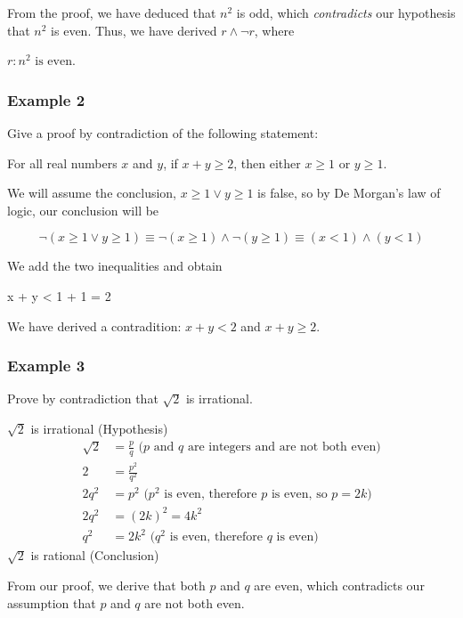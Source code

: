 From the proof, we have deduced that $n^2$ is odd, which \textit{contradicts} our hypothesis that $n^2$ is even.  Thus, we have derived $r \land \lnot r$, where 
\begin{center}
    $r: \text{$n^2$ is even}$.
\end{center}

\subsubsection*{Example 2}

Give a proof by contradiction of the following statement:
\begin{center}
    For all real numbers $x$ and $y$, if $x + y \geq 2$, then either $x \geq 1$ or $y \geq 1$.
\end{center}

We will assume the conclusion, $x \geq 1 \vee y \geq 1$ is false, so by De Morgan's law of logic, our conclusion will be

\[
    \lnot(x \geq 1 \vee y \geq 1) \equiv \lnot(x \geq 1) \land \lnot(y \geq 1) \equiv (x < 1) \land (y < 1)
\]

We add the two inequalities and obtain
\begin{center}
    x + y < 1 + 1 = 2
\end{center}

We have derived a contradition: $x + y < 2$ and $x + y \geq 2$.


\subsubsection*{Example 3}

Prove by contradiction that $\sqrt{2}$ is irrational.

$\sqrt{2}$ is irrational (Hypothesis)
\begin{align*}
\sqrt{2} &= \frac{p}{q} \text{ ($p$ and $q$ are integers and are not both even)}\\
2 &= \frac{p^2}{q^2}\\
2q^2 &= p^2 \text{ ($p^2$ is even, therefore $p$ is even, so $p = 2k$)}\\
2q^2 &= (2k)^2 = 4k^2\\
q^2 &= 2k^2 \text{ ($q^2$ is even, therefore $q$ is even)}
\end{align*}
$\sqrt{2}$ is rational (Conclusion)

From our proof, we derive that both $p$ and $q$ are even, which contradicts our assumption that $p$ and $q$ are not both even.

